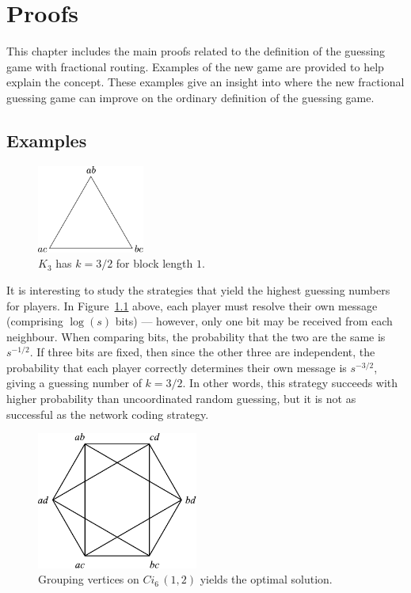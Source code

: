 
\chapter{Proofs}
\label{ch:sol}

This chapter includes the main proofs related to the definition of the guessing game with fractional routing. Examples of the new game are provided to help explain the concept. These examples give an insight into where the new fractional guessing game can improve on the ordinary definition of the guessing game.

\section{Examples}

\begin{figure}[ht]
	\centering
	\includegraphics[width=100pt]{figures/k3.pdf}
	\caption[Resolving messages on $K_3$]{$K_3$ has $k = 3/2$ for block length $1$.}
  \label{k3}
\end{figure}

It is interesting to study the strategies that yield the highest guessing numbers for players. In Figure~\ref{k3} above, each player must resolve their own message (comprising $\log(s)$ bits) --- however, only one bit may be received from each neighbour. When comparing bits, the probability that the two are the same is $s^{-1/2}$. If three bits are fixed, then since the other three are independent, the probability that each player correctly determines their own message is $s^{-3/2}$, giving a guessing number of $k = 3/2$. In other words, this strategy succeeds with higher probability than uncoordinated random guessing, but it is not as successful as the network coding strategy.

\begin{figure}[ht]
	\centering
	\includegraphics[width=150pt]{figures/n6.pdf}
	\caption[Optimal solutions by grouping vertices]{Grouping vertices on $Ci_6 \, (1, 2)$ yields the optimal solution.}
	\label{n6}
\end{figure}


